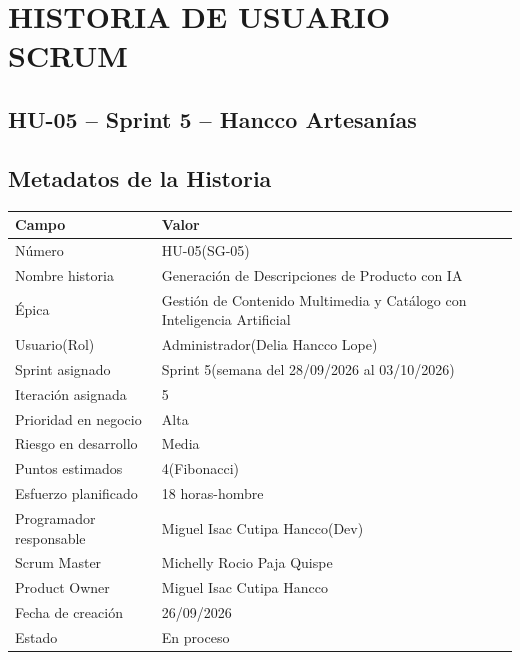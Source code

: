 \documentclass[12pt,a4paper]{article}
\begin{document}
\thispagestyle{fancy}

\section*{HISTORIA DE USUARIO SCRUM}

\subsection*{HU-05 -- Sprint 5 -- Hancco Artesanías}

\subsection*{Metadatos de la Historia}

\begin{center}
\small
\begin{tabularx}{\textwidth}{p{4.5cm} L}
\toprule
\textbf{Campo} & \textbf{Valor} \\
\midrule
Número & HU-05(SG-05) \\
Nombre historia & Generación de Descripciones de Producto con IA \\
Épica & Gestión de Contenido Multimedia y Catálogo con Inteligencia Artificial \\
Usuario(Rol) & Administrador(Delia Hancco Lope) \\
Sprint asignado & Sprint 5(semana del 28/09/2026 al 03/10/2026) \\
Iteración asignada & 5 \\
Prioridad en negocio & Alta \\
Riesgo en desarrollo & Media \\
Puntos estimados & 4(Fibonacci) \\
Esfuerzo planificado & 18 horas-hombre \\
Programador responsable & Miguel Isac Cutipa Hancco(Dev) \\
Scrum Master & Michelly Rocio Paja Quispe \\
Product Owner & Miguel Isac Cutipa Hancco \\
Fecha de creación & 26/09/2026 \\
Estado & En proceso \\
\bottomrule
\end{tabularx}
\end{center}

\end{document}
